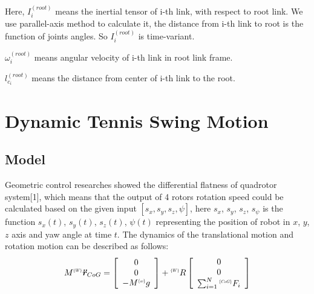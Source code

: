 \documentclass{jarticle}
\begin{document}
Here, $I_i^{(root)}$ means the inertial tensor of i-th link, with respect to root link. We use parallel-axis method to calculate it, the distance from i-th link to root is the function of joints angles. So $I_i^{(root)}$ is time-variant.

$\omega_i^{(root)}$ means angular velocity of i-th link in root link frame.

$l_{c_i}^{(root)}$ means the distance from center of i-th link to the root.

\section{Dynamic Tennis Swing Motion}

\subsection{Model}
Geometric control researches showed the differential flatness of quadrotor  system[1], which means that the output of 4 rotors rotation speed could be calculated based on the given input $[s_x, s_y, s_z, ψ]$, here $s_x$, $s_y$, $s_z$, $s_ψ$ is the function $s_x(t)$, $s_y(t)$, $s_z(t)$, $ψ(t)$  representing the position of robot in $x$, $y$, $z$ axis and yaw angle at time $t$.
The dynamics of the translational motion and rotation motion can be described as follows:
\begin{equation}
  \label{eq:model1}
  M^{\scalebox{.5}{$\{W\}$}}\bm{\ddot{r}}_{CoG} =\left[ \begin{array}{c}
      0 \\
      0 \\
      -M^{\scalebox{.5}{$\{w\}$}}g
    \end{array}\right]
  + {}^{\scalebox{.5}{$\{W\}$}}R \left[ \begin{array}{c}
        0 \\
        0 \\
        \sum_{i=1}^{N} {}^{\scalebox{.5}{$\{CoG\}$}}F_i
      \end{array}\right]
\end{equation}
\end{document}
